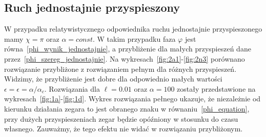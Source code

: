 \newpage
\subsection{Ruch jednostajnie przyspieszony}
W przypadku relatywistycznego odpowiednika ruchu jednostajnie 
przyspieszonego mamy $\chi = \pi$ oraz $\alpha = const$.
W takim przypadku faza $\varphi$ jest 
równa~\eqref{phi_wynik_jednostajnie}, a 
przybliżenie dla małych przyspieszeń dane 
przez~\eqref{phi_szereg_jednostajnie}.
Na wykresach~\ref{fig:2a1}-\ref{fig:2n3} porównano rozwiązanie
przybliżone z rozwiązaniem pełnym dla różnych przyspieszeń. 
Widzimy, że przybliżenie jest dobre dla odpowiednio małych 
wartości $\epsilon = 
\epsilon = \alpha / \alpha_c$.
Rozwiązania dla $\ell=0.01$ oraz $\alpha=100$ 
zostały przedstawione na wykresach~\ref{fig:1a}-\ref{fig:1d}.
Wykres rozwiązania pełnego ukazuje, 
że niezależnie od kierunku działania zegara to jest 
obranego znaku w równaniu~\eqref{phi_equation}, przy dużych 
przyspieszeniach zegar będzie opóźniony w stosunku do
czasu własnego. Zauważmy, że 
tego efektu nie widać w rozwiązaniu przybliżonym.

